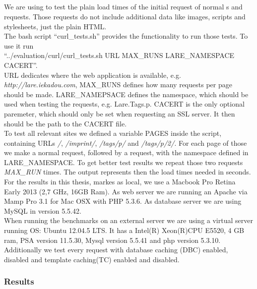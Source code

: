 \subsection{\curl{}\label{curl}}
We are using \curl{} to test the plain load times of the initial request of normal \httpRequest{}s and \lare{} requests.
Those \curl{} requests do not include additional data like images, scripts and stylesheets, just the plain HTML.
\\
The bash script \enquote{curl\_tests.sh} provides the functionality to run those \curl{} tests.
To use it run
\\
\enquote{../evaluation/curl/curl\_tests.sh URL MAX\_RUNS LARE\_NAMESPACE CACERT}.
\\
URL dedicates where the web application is available, e.g. \emph{http://lare.iekadou.com}, MAX\_RUNS defines how many \curl{} requests per page should be made.
LARE\_NAMEPSACE defines the namespace, which should be used when testing the \lare{} requests, e.g. Lare.Tags.p.
CACERT is the only optional paremeter, which should only be set when requesting an SSL server. It then should be the path to the CACERT file.
\\
To test all relevant sites we defined a variable PAGES inside the script, containing URLs \emph{/}, \emph{/imprint/}, \emph{/tags/p/} and \emph{/tags/p/2/}.
For each page of those we make a normal request, followed by a \lare{} request, with the namespace defined in LARE\_NAMESPACE. 
To get better test results we repeat those two requests \emph{MAX\_RUN} times. The output represents then the load times needed in seconds.
\\
For the results in this thesis, markes as local, we use a Macbook Pro Retina Early 2013 (2,7 GHz, 16GB Ram).
As web server we are running an Apache via Mamp Pro 3.1 for Mac OSX with PHP 5.3.6.
As database server we are using MySQL in version 5.5.42.
\\
When running the benchmarks on an external server we are using a virtual server running OS: Ubuntu 12.04.5 LTS.
It has a Intel(R) Xeon(R)CPU E5520, 4 GB ram, PSA version 11.5.30, Mysql version 5.5.41 and php version 5.3.10.
\\
Additionally we test every request with database caching (DBC) enabled, disabled and template caching(TC) enabled and disabled.

\subsubsection{Results}


